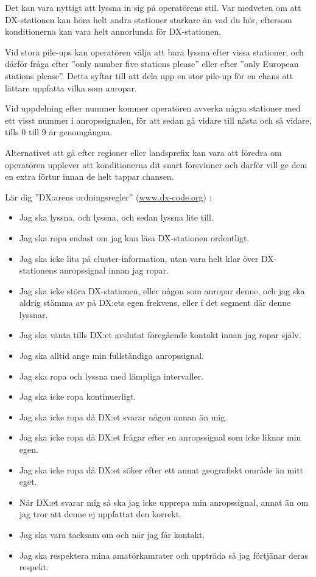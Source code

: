 Det kan vara nyttigt att lyssna in sig på operatörens stil.
Var medveten om att DX-stationen kan höra helt andra stationer starkare än vad du hör,
eftersom konditionerna kan vara helt annorlunda för DX-stationen.

Vid stora pile-ups kan operatören välja att bara lyssna efter vissa stationer,
och därför fråga efter ''only number five stations please'' eller efter ''only
European stations please''.
Detta syftar till att dela upp en stor pile-up för en chans att lättare
uppfatta vilka som anropar.

Vid uppdelning efter nummer kommer operatören avverka några stationer med ett
visst nummer i anropssignalen, för att sedan gå vidare till nästa och så
vidare, tills 0 till 9 är genomgångna.

Alternativet att gå efter regioner eller landsprefix kan vara att föredra om
operatören upplever att konditionerna dit snart försvinner och därför vill ge
dem en extra förtur innan de helt tappar chansen.

Lär dig ''DX:arens ordningsregler'' (\href{http://www.dx-code.org/}{www.dx-code.org}) :

\begin{itemize}
	\item Jag ska lyssna, och lyssna, och sedan lyssna lite till.
	\item Jag ska ropa endast om jag kan läsa DX-stationen ordentligt.
	\item Jag ska icke lita på cluster-information, utan vara helt klar över DX-stationens anropssignal innan jag ropar.
	\item Jag ska icke störa DX-stationen, eller någon som anropar denne, och jag ska aldrig stämma av på DX:ets egen frekvens, eller i det segment där denne lyssnar.
	\item Jag ska vänta tills DX:et avslutat föregående kontakt innan jag ropar själv.
	\item Jag ska alltid ange min fullständiga anropssignal.
	\item Jag ska ropa och lyssna med lämpliga intervaller.
	\item Jag ska icke ropa kontinuerligt.
	\item Jag ska icke ropa då DX:et svarar någon annan än mig.
	\item Jag ska icke ropa då DX:et frågar efter en anropssignal som icke liknar min egen.
	\item Jag ska icke ropa då DX:et söker efter ett annat geografiskt område än mitt eget.
	\item När DX:et svarar mig så ska jag icke upprepa min anropssignal, annat än om jag tror att denne ej uppfattat den korrekt.
	\item Jag ska vara tacksam om och när jag får kontakt.
	\item Jag ska respektera mina amatörkamrater och uppträda så jag förtjänar deras respekt.
	\end{itemize}

